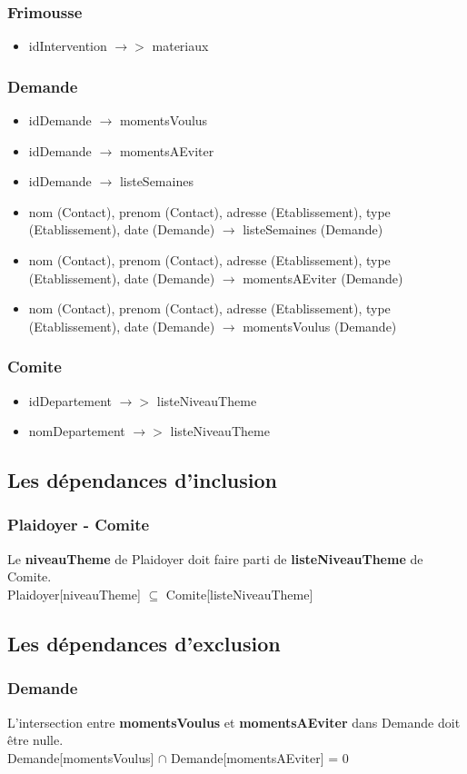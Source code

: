 \subsubsection*{Frimousse}
\begin{itemize}
\item[]	idIntervention $\rightarrow >$ materiaux
\end{itemize}

\subsubsection*{Demande}
\begin{itemize}
\item[] idDemande $\rightarrow$ momentsVoulus
\item[] idDemande $\rightarrow$ momentsAEviter
\item[] idDemande $\rightarrow$ listeSemaines
\item[] nom (Contact), prenom (Contact), adresse (Etablissement), type (Etablissement), date (Demande) $\rightarrow$ listeSemaines (Demande) 
\item[] nom (Contact), prenom (Contact), adresse (Etablissement), type (Etablissement), date (Demande) $\rightarrow$ momentsAEviter (Demande) 
\item[] nom (Contact), prenom (Contact), adresse (Etablissement), type (Etablissement), date (Demande) $\rightarrow$ momentsVoulus (Demande) 
\end{itemize}

\subsubsection*{Comite}
\begin{itemize}
\item[] idDepartement $\rightarrow >$ listeNiveauTheme
\item[] nomDepartement $\rightarrow >$ listeNiveauTheme
\end{itemize}

\subsection{Les dépendances d'inclusion}

\subsubsection*{Plaidoyer - Comite}
Le \textbf{niveauTheme} de Plaidoyer doit faire parti de \textbf{listeNiveauTheme} de Comite.\\
\indent \indent Plaidoyer[niveauTheme] $ \subseteq $ Comite[listeNiveauTheme]

\subsection{Les dépendances d'exclusion}

\subsubsection*{Demande}
L'intersection entre \textbf{momentsVoulus} et \textbf{momentsAEviter} dans Demande doit être nulle. \\
\indent \indent Demande[momentsVoulus] $ \cap $ Demande[momentsAEviter] = 0
